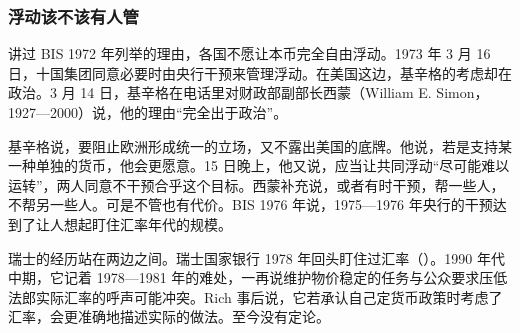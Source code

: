 \subsubsection{浮动该不该有人管}

讲过 BIS 1972 年列举的理由，各国不愿让本币完全自由浮动\cite{bis1972}。1973 年 3 月 16 日，十国集团同意必要时由央行干预来管理浮动\cite{bis1973}。在美国这边，基辛格的考虑却在政治。3 月 14 日，基辛格在电话里对财政部副部长西蒙（William E. Simon，1927—2000）说，他的理由“完全出于政治”\cite{frus46b,loc46}。

基辛格说，要阻止欧洲形成统一的立场，又不露出美国的底牌\cite{frus46b}。他说，若是支持某一种单独的货币，他会更愿意\cite{frus46b}。15 日晚上，他又说，应当让共同浮动“尽可能难以运转”，两人同意不干预合乎这个目标\cite{frus46b}。西蒙补充说，或者有时干预，帮一些人，不帮另一些人\cite{frus46b}。可是不管也有代价。BIS 1976 年说，1975—1976 年央行的干预达到了让人想起盯住汇率年代的规模\cite{bis1976}。

瑞士的经历站在两边之间。瑞士国家银行 1978 年回头盯住过汇率（）。1990 年代中期，它记着 1978—1981 年的难处，一再说维护物价稳定的任务与公众要求压低法郎实际汇率的呼声可能冲突\cite{rich2003}。Rich 事后说，它若承认自己定货币政策时考虑了汇率，会更准确地描述实际的做法\cite{rich2003}。至今没有定论。

